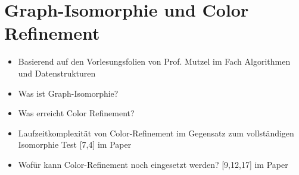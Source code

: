 \section{Graph-Isomorphie und Color Refinement}

\begin{itemize}
	\item Basierend auf den Vorlesungsfolien von Prof. Mutzel im Fach Algorithmen und Datenstrukturen
	\item Was ist Graph-Isomorphie?
	\item Was erreicht Color Refinement?
	\item Laufzeitkomplexität von Color-Refinement im Gegensatz zum vollständigen Isomorphie Test [7,4] im Paper
	\item Wofür kann Color-Refinement noch eingesetzt werden? [9,12,17] im Paper
\end{itemize}